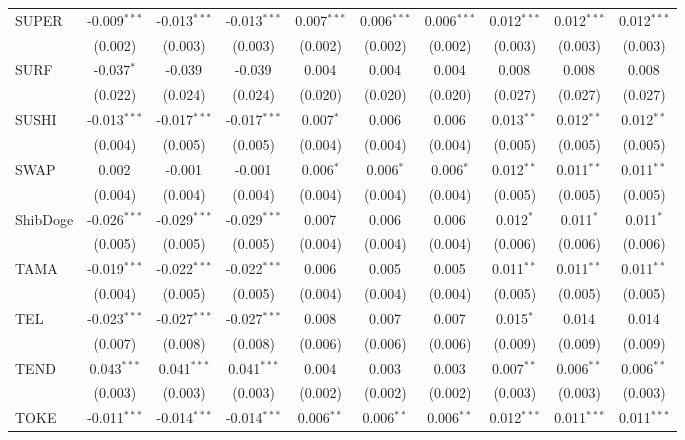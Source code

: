 \begin{table}[!htbp]
\begin{tabular}{@{\extracolsep{5pt}}lccccccccc}
 SUPER & -0.009$^{***}$ & -0.013$^{***}$ & -0.013$^{***}$ & 0.007$^{***}$ & 0.006$^{***}$ & 0.006$^{***}$ & 0.012$^{***}$ & 0.012$^{***}$ & 0.012$^{***}$ \\
  & (0.002) & (0.003) & (0.003) & (0.002) & (0.002) & (0.002) & (0.003) & (0.003) & (0.003) \\
 SURF & -0.037$^{*}$ & -0.039$^{}$ & -0.039$^{}$ & 0.004$^{}$ & 0.004$^{}$ & 0.004$^{}$ & 0.008$^{}$ & 0.008$^{}$ & 0.008$^{}$ \\
  & (0.022) & (0.024) & (0.024) & (0.020) & (0.020) & (0.020) & (0.027) & (0.027) & (0.027) \\
 SUSHI & -0.013$^{***}$ & -0.017$^{***}$ & -0.017$^{***}$ & 0.007$^{*}$ & 0.006$^{}$ & 0.006$^{}$ & 0.013$^{**}$ & 0.012$^{**}$ & 0.012$^{**}$ \\
  & (0.004) & (0.005) & (0.005) & (0.004) & (0.004) & (0.004) & (0.005) & (0.005) & (0.005) \\
 SWAP & 0.002$^{}$ & -0.001$^{}$ & -0.001$^{}$ & 0.006$^{*}$ & 0.006$^{*}$ & 0.006$^{*}$ & 0.012$^{**}$ & 0.011$^{**}$ & 0.011$^{**}$ \\
  & (0.004) & (0.004) & (0.004) & (0.004) & (0.004) & (0.004) & (0.005) & (0.005) & (0.005) \\
 ShibDoge & -0.026$^{***}$ & -0.029$^{***}$ & -0.029$^{***}$ & 0.007$^{}$ & 0.006$^{}$ & 0.006$^{}$ & 0.012$^{*}$ & 0.011$^{*}$ & 0.011$^{*}$ \\
  & (0.005) & (0.005) & (0.005) & (0.004) & (0.004) & (0.004) & (0.006) & (0.006) & (0.006) \\
 TAMA & -0.019$^{***}$ & -0.022$^{***}$ & -0.022$^{***}$ & 0.006$^{}$ & 0.005$^{}$ & 0.005$^{}$ & 0.011$^{**}$ & 0.011$^{**}$ & 0.011$^{**}$ \\
  & (0.004) & (0.005) & (0.005) & (0.004) & (0.004) & (0.004) & (0.005) & (0.005) & (0.005) \\
 TEL & -0.023$^{***}$ & -0.027$^{***}$ & -0.027$^{***}$ & 0.008$^{}$ & 0.007$^{}$ & 0.007$^{}$ & 0.015$^{*}$ & 0.014$^{}$ & 0.014$^{}$ \\
  & (0.007) & (0.008) & (0.008) & (0.006) & (0.006) & (0.006) & (0.009) & (0.009) & (0.009) \\
 TEND & 0.043$^{***}$ & 0.041$^{***}$ & 0.041$^{***}$ & 0.004$^{}$ & 0.003$^{}$ & 0.003$^{}$ & 0.007$^{**}$ & 0.006$^{**}$ & 0.006$^{**}$ \\
  & (0.003) & (0.003) & (0.003) & (0.002) & (0.002) & (0.002) & (0.003) & (0.003) & (0.003) \\
 TOKE & -0.011$^{***}$ & -0.014$^{***}$ & -0.014$^{***}$ & 0.006$^{**}$ & 0.006$^{**}$ & 0.006$^{**}$ & 0.012$^{***}$ & 0.011$^{***}$ & 0.011$^{***}$ \\

\end{tabular}
\end{table}

